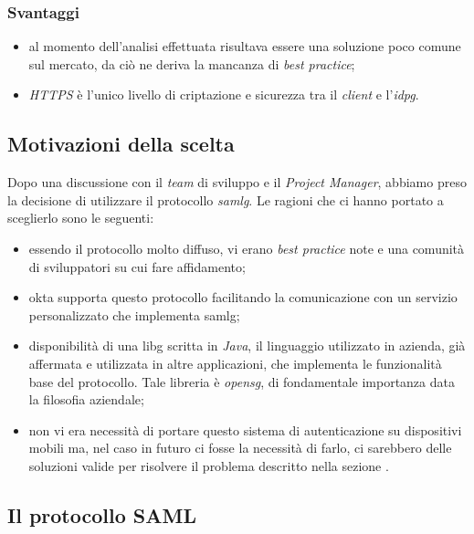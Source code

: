     \subsubsection{Svantaggi}
    \begin{itemize}
        \setlength\itemsep{0em}
        \item al momento dell'analisi effettuata risultava essere una soluzione poco comune sul mercato, da ciò ne deriva la mancanza di \textit{best practice};
        \item \textit{HTTPS} è l'unico livello di criptazione e sicurezza tra il \textit{client} e l'\textit{\gls{idpg}}.
    \end{itemize}

\subsection{Motivazioni della scelta}
Dopo una discussione con il \textit{team} di sviluppo e il \textit{Project Manager}, abbiamo preso la decisione di utilizzare il protocollo \textit{\gls{samlg}}. Le ragioni che ci hanno portato a sceglierlo sono le seguenti:
\begin{itemize}
    \item essendo il protocollo molto diffuso, vi erano \textit{best practice} note e una comunità di sviluppatori su cui fare affidamento;
    \item \gls{okta} supporta questo protocollo facilitando la comunicazione con un servizio personalizzato che implementa \gls{samlg};
    \item disponibilità di una \gls{libg} scritta in \textit{Java}, il linguaggio utilizzato in azienda, già affermata e utilizzata in altre applicazioni, che implementa le funzionalità base del protocollo. Tale libreria è \textit{\gls{opensg}}, di fondamentale importanza data la filosofia aziendale;
    \item non vi era necessità di portare questo sistema di autenticazione su dispositivi mobili ma, nel caso in futuro ci fosse la necessità di farlo, ci sarebbero delle soluzioni valide per risolvere il problema descritto nella sezione .
\end{itemize}

\subsection{Il protocollo SAML}
